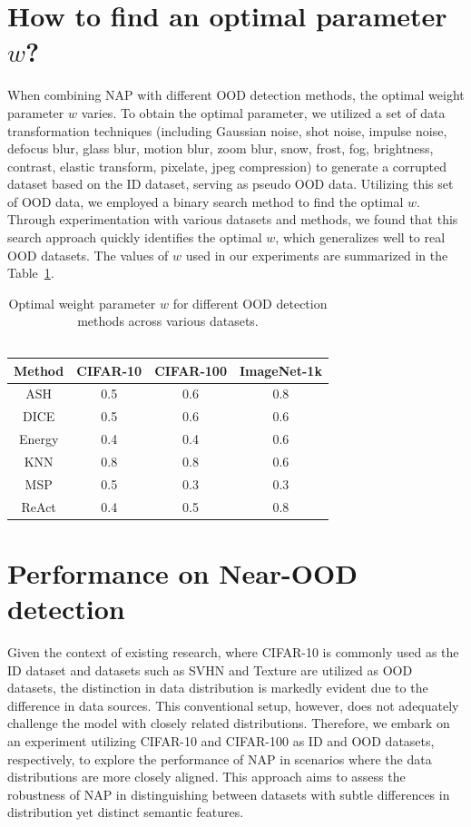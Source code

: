 \section{How to find an optimal parameter $w$?}
\label{appendix:w}
When combining NAP with different OOD detection methods, the optimal weight parameter \(w\) varies. To obtain the optimal parameter, we utilized a set of data transformation techniques (including Gaussian noise, shot noise, impulse noise, defocus blur, glass blur, motion blur, zoom blur, snow, frost, fog, brightness, contrast, elastic transform, pixelate, jpeg compression) to generate a corrupted dataset based on the ID dataset, serving as pseudo OOD data. Utilizing this set of OOD data, we employed a binary search method to find the optimal \(w\). Through experimentation with various datasets and methods, we found that this search approach quickly identifies the optimal \(w\), which generalizes well to real OOD datasets. The values of \(w\) used in our experiments are summarized in the Table~\ref{tab:w}.
\begin{table}[]
    \centering
    \footnotesize
    \caption{Optimal weight parameter \(w\) for different OOD detection methods across various datasets.\\\quad \\}
    \label{tab:w}
    \begin{tabular}{cc|c|c}
        \hline 
        Method & CIFAR-10 & CIFAR-100 & ImageNet-1k\tabularnewline
        \hline 
        ASH & 0.5 & 0.6 & 0.8\tabularnewline
        DICE & 0.5 & 0.6 & 0.6\tabularnewline
        Energy & 0.4 & 0.4 & 0.6\tabularnewline
        KNN & 0.8 & 0.8 & 0.6\tabularnewline
        MSP & 0.5 & 0.3 & 0.3\tabularnewline
        ReAct & 0.4 & 0.5 & 0.8\tabularnewline
        \hline 
        \end{tabular}
\end{table}


\section{Performance on Near-OOD detection}
\label{appendix:near}
Given the context of existing research, where CIFAR-10 is commonly used as the ID dataset and datasets such as SVHN and Texture are utilized as OOD datasets, the distinction in data distribution is markedly evident due to the difference in data sources. This conventional setup, however, does not adequately challenge the model with closely related distributions. Therefore, we embark on an experiment utilizing CIFAR-10 and CIFAR-100 as ID and OOD datasets, respectively, to explore the performance of NAP in scenarios where the data distributions are more closely aligned. This approach aims to assess the robustness of NAP in distinguishing between datasets with subtle differences in distribution yet distinct semantic features.

